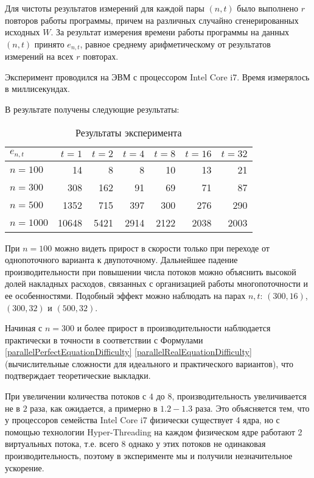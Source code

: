 \documentclass{article}
\begin{document}
	Для чистоты результатов измерений для каждой пары $(n,t)$ было выполнено $r$ повторов работы программы, причем на различных случайно сгенерированных исходных $W$. За результат измерения времени работы программы на данных $(n,t)$ принято $e_{n,t}$, равное среднему арифметическому от результатов измерений на всех $r$ повторах.
	
	Эксперимент проводился на ЭВМ с процессором Intel Core i7. Время измерялось в миллисекундах.
	
	В результате получены следующие результаты:
	
	\begin{table}[h]
	\caption{Результаты эксперимента}
	\begin{center}
	\begin{tabular}{ | l | rrrrrr | }
		\hline
		$e_{n,t}$ & $t=1$   & $t=2$  & $t=4$  & $t=8$  & $t=16$ & $t=32$ \\ 
		\hline        
		$n=100$   & 14      & 8      & 8      & 10     & 13     & 21     \\
		$n=300$   & 308     & 162    & 91     & 69     & 71     & 87     \\
		$n=500$   & 1352    & 715    & 397    & 300    & 276    & 290    \\
		$n=1000$  & 10648   & 5421   & 2914   & 2122   & 2038   & 2003   \\
		\hline
		\end{tabular}
	\end{center}
	\end{table}
	
	При $n=100$ можно видеть прирост в скорости только при переходе от однопоточного варианта к двупоточному. Дальнейшее падение производительности при повышении числа потоков можно объяснить высокой долей накладных расходов, связанных с организацией работы многопоточности и ее особенностями. Подобный эффект можно наблюдать на парах $n,t$: $(300,16)$, $(300,32)$ и $(500,32)$.
	
	Начиная с $n=300$ и более прирост в производительности наблюдается практически в точности в соответствии с Формулами \ref{parallelPerfectEquationDifficulty} \ref{parallelRealEquationDifficulty} (вычислительные сложности для идеального и практического вариантов), что подтверждает теоретические выкладки.
	
	При увеличении количества потоков с $4$ до $8$, производительность увеличивается не в $2$ раза, как ожидается, а примерно в $1.2-1.3$ раза. Это объясняется тем, что у процессоров семейства Intel Core i7 физически существует 4 ядра, но с помощью технологии Hyper-Threading на каждом физическом ядре работают 2 виртуальных потока, т.е. всего $8$ однако у этих потоков не одинаковая производительность, поэтому в эксперименте мы и получили незначительное ускорение.
	
\end{document}
